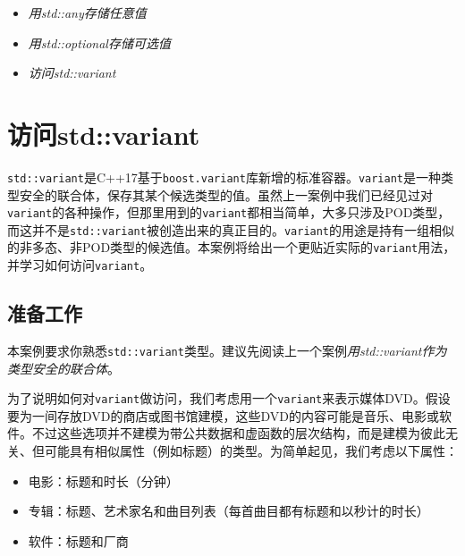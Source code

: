 
\begin{itemize}
\item \textit{用std::any存储任意值}



\item \textit{用std::optional存储可选值}



\item \textit{访问std::variant}

\end{itemize}



\section{访问std::variant}



\texttt{std::\allowbreak{}variant}是C++17基于\texttt{boost.\allowbreak{}variant}库新增的标准容器。\texttt{variant}是一种类型安全的联合体，保存其某个候选类型的值。虽然上一案例中我们已经见过对\texttt{variant}的各种操作，但那里用到的\texttt{variant}都相当简单，大多只涉及POD类型，而这并不是\texttt{std::\allowbreak{}variant}被创造出来的真正目的。\texttt{variant}的用途是持有一组相似的非多态、非POD类型的候选值。本案例将给出一个更贴近实际的\texttt{variant}用法，并学习如何访问\texttt{variant}。



\subsection{准备工作}



本案例要求你熟悉\texttt{std::\allowbreak{}variant}类型。建议先阅读上一个案例\textit{用std::variant作为类型安全的联合体}。



为了说明如何对\texttt{variant}做访问，我们考虑用一个\texttt{variant}来表示媒体DVD。假设要为一间存放DVD的商店或图书馆建模，这些DVD的内容可能是音乐、电影或软件。不过这些选项并不建模为带公共数据和虚函数的层次结构，而是建模为彼此无关、但可能具有相似属性（例如标题）的类型。为简单起见，我们考虑以下属性：



\begin{itemize}
\item 电影：标题和时长（分钟）



\item 专辑：标题、艺术家名和曲目列表（每首曲目都有标题和以秒计的时长）



\item 软件：标题和厂商

\end{itemize}


